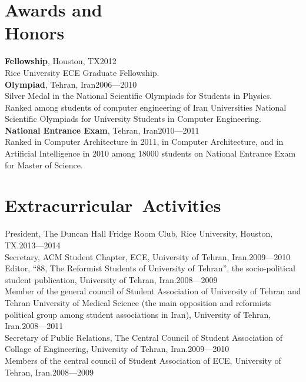 \documentclass[overlapped]{res}
\begin{document}
\begin{resume}
\section{Awards and\\ Honors}
{\bf Fellowship}, Houston, TX\hfill 2012\\
Rice University ECE Graduate Fellowship.\\
{\bf Olympiad}, Tehran, Iran\hfill\hfill 2006---2010\\
Silver Medal in the National Scientific Olympiads for Students in Physics.\\
Ranked  among students of computer engineering of Iran Universities National Scientific Olympiads for University Students in Computer Engineering.\\
{\bf National Entrance Exam}, Tehran, Iran\hfill 2010---2011\\
Ranked  in Computer Architecture in 2011,  in Computer Architecture, and  in Artificial Intelligence in 2010 among 18000 students on National Entrance Exam for Master of Science.\\

\section{Extracurricular\ Activities}
President, The Duncan Hall Fridge Room Club, Rice University, Houston, TX.\hfill 2013---2014\\
Secretary, ACM Student Chapter, ECE, University of Tehran, Iran.\hfill 2009---2010\\
Editor, ``88, The Reformist Students of University of Tehran'', the socio-political student publication, University of Tehran, Iran.\hfill 2008---2009\\
Member of the general council of Student Association of University of Tehran and Tehran University of Medical Science (the main opposition and reformists political group among student associations in Iran), University of Tehran, Iran.\hfill 2008---2011\\
Secretary of Public Relations, The Central Council of Student Association of Collage of Engineering, University of Tehran, Iran.\hfill 2009---2010\\
Members of the central council of Student Association of ECE, University of Tehran, Iran.\hfill 2008---2009


\end{resume}
\end{document}
